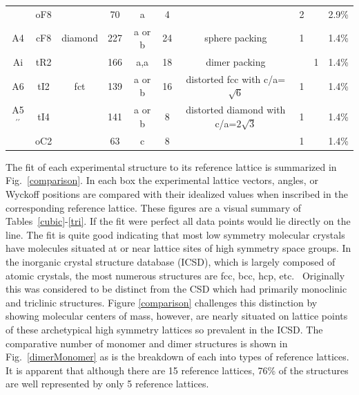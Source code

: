 \documentclass[preprint]{iucr}              %
\begin{document}
\begin{landscape}
\begin{table}
\begin{tabular}{cccccccccc}
    & oF8 &     & 70  & a           &  4 &                                        &  2 &   & 2.9\%\\
A4  & cF8 & diamond & 227 & a or b  & 24 & sphere packing                         &  1 &   & 1.4\%\\
Ai  & tR2 &     & 166 & a,a         & 18 & dimer packing                          &    & 1 & 1.4\%\\
A6  & tI2 & fct & 139 & a or b      & 16 & distorted fcc with c/a=$\sqrt 6$       &  1 &   & 1.4\%\\
A5$^{\prime\prime}$ & tI4 & & 141 & a or b  & 8 & distorted diamond with c/a=$2\sqrt 3$&1& & 1.4\%\\
    & oC2 &     &  63 & c           &  8 &                                        &  1 &   & 1.4\%\\
\hline
\end{tabular}
\end{table}
\end{landscape}

The fit of each experimental structure to its reference lattice is
summarized in Fig.~\ref{comparison}. In each box the experimental
lattice vectors, angles, or Wyckoff positions are compared with
their idealized values when inscribed in the corresponding reference
lattice. These figures are a visual summary of
Tables~\ref{cubic}-\ref{tri}. If the fit were perfect all data
points would lie directly on the line. The fit is quite good
indicating that most low symmetry molecular crystals have molecules
situated at or near lattice sites of high symmetry space groups. In
the inorganic crystal structure database (ICSD), which is largely
composed of atomic crystals, the most numerous structures are fcc,
bcc, hcp, etc.~\cite{Mighell80} Originally this was considered to be
distinct from the CSD which had primarily monoclinic and triclinic
structures. Figure \ref{comparison} challenges this distinction by
showing molecular centers of mass, however, are nearly situated on
lattice points of these archetypical high symmetry lattices so
prevalent in the ICSD. The comparative number of monomer and dimer
structures is shown in Fig.~\ref{dimerMonomer} as is the breakdown
of each into types of reference lattices. It is apparent that
although there are 15 reference lattices, 76\% of the structures are
well represented by only 5 reference lattices.
\end{document}
